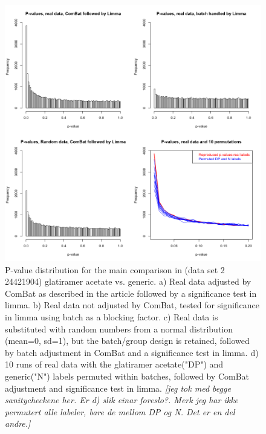 \documentclass{bio}
\newcommand\NB[1]{\textcolor{NBcol}{\textit{#1}}} %
\newcommand\NOTE[1]{\NB{[#1]}} %
\begin{document}
\begin{figure}[!p]
\centering\includegraphics[width=13cm]{Fig/pvaluestowfic.png}
\caption{
P-value distribution for the main comparison in (data set 2 24421904) glatiramer acetate vs. generic.  
a) Real data adjusted by ComBat as described in the article followed by a significance test in limma. 
b) Real data not adjusted by ComBat, tested for significance in limma using batch as a blocking factor. 
c) Real data is substituted with random numbers from a normal distribution (mean=0, sd=1), but the batch/group design is retained, followed by batch adjustment in ComBat and a significance test in limma.
d) 10 runs of real data with the glatiramer acetate("DP") and generic("N") labels permuted within batches, followed by ComBat adjustment and significance test in limma.  
\NOTE{jeg tok med begge sanitycheckene her. Er d) slik einar foreslo?. Merk jeg har ikke permutert alle labeler, bare de mellom DP og N. Det er en del andre.}
}
\label{p-towfic}
\end{figure}
\end{document}
